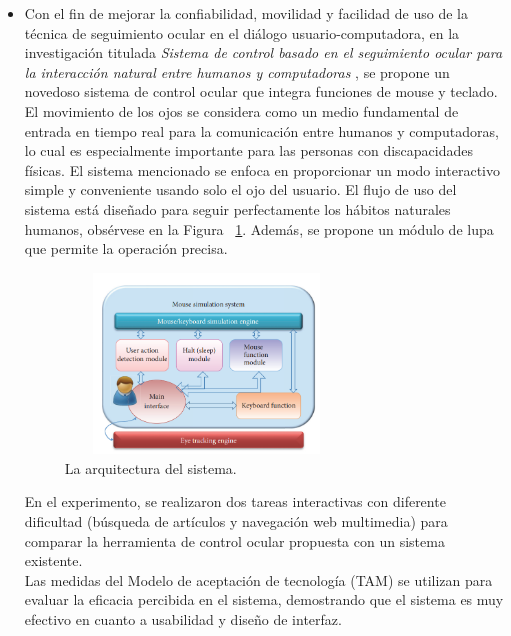 \documentclass[10pt,journal]{IEEEtran}
\begin{document}
    \begin{itemize}
        \item Con el fin de mejorar la confiabilidad, movilidad y facilidad de uso de la técnica de seguimiento ocular en el diálogo usuario-computadora, en la investigación titulada \textit{Sistema de control basado en el seguimiento ocular para la interacción natural entre humanos y computadoras} \citep{zhang2017eye}, se propone un novedoso sistema de control ocular que integra funciones de mouse y teclado. 
        El movimiento de los ojos se considera como un medio fundamental de entrada en tiempo real para la comunicación entre humanos y computadoras, lo cual es especialmente importante para las personas con discapacidades físicas. El sistema mencionado se enfoca en proporcionar un modo interactivo simple y conveniente usando solo el ojo del usuario. El flujo de uso del sistema está diseñado para seguir perfectamente los hábitos naturales humanos, obsérvese en la Figura ~\ref{f1}. Además, se propone un módulo de lupa que permite la operación precisa. 
        \begin{figure}[H]
        \begin{center}
        \includegraphics[width=7.5cm, height=4.8cm]{figuras/eyes.PNG}
        \caption{La arquitectura del sistema.}
        \label{f1} 
        \end{center}
        \end{figure}
        
        En el experimento, se realizaron dos tareas interactivas con diferente dificultad (búsqueda de artículos y navegación web multimedia) para comparar la herramienta de control ocular propuesta con un sistema existente.
        \\ Las medidas del Modelo de aceptación de tecnología (TAM) se utilizan para evaluar la eficacia percibida en el sistema, demostrando que el sistema es muy efectivo en cuanto a usabilidad y diseño de interfaz.
        
    \end{itemize}
    
\end{document}
